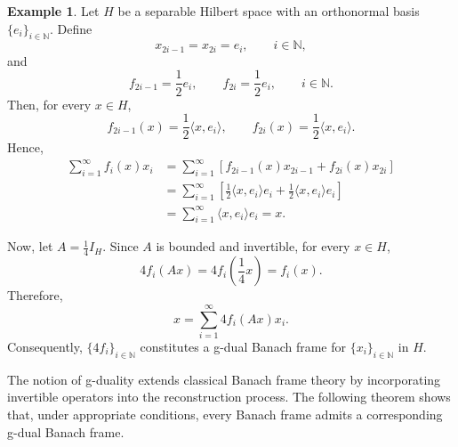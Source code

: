 \documentclass[12pt]{article}
\theoremstyle{definition}
\newtheorem{example}[theorem]{Example}
\theoremstyle{remark}
\begin{document}
\begin{example}
Let \(H\) be a separable Hilbert space with an orthonormal basis
\(\{e_i\}_{i\in\mathbb{N}}\). Define
\[
x_{2i-1}=x_{2i}=e_i,\qquad i\in\mathbb{N},
\]
and
\[
f_{2i-1}=\frac{1}{2}e_i,\qquad
f_{2i}=\frac{1}{2}e_i,\qquad i\in\mathbb{N}.
\]
Then, for every \(x\in H\),
\[
f_{2i-1}(x)=\frac{1}{2}\langle x,e_i\rangle,
\qquad
f_{2i}(x)=\frac{1}{2}\langle x,e_i\rangle.
\]
Hence,
\begin{align*}
	\sum_{i=1}^{\infty} f_i(x)x_i
	&=
	\sum_{i=1}^{\infty}
	\left[
	f_{2i-1}(x)x_{2i-1}
	+
	f_{2i}(x)x_{2i}
	\right]\\
	&=
	\sum_{i=1}^{\infty}
	\left[
	\frac{1}{2}\langle x,e_i\rangle e_i
	+
	\frac{1}{2}\langle x,e_i\rangle e_i
	\right]\\
	&=
	\sum_{i=1}^{\infty}
	\langle x,e_i\rangle e_i
	=x.
\end{align*}

Now, let \(A=\frac{1}{4}I_H\). Since \(A\) is bounded and invertible,
for every \(x\in H\),
\[
4f_i(Ax)
=
4f_i\left(\frac{1}{4}x\right)
=f_i(x).
\]
Therefore,
\[
x=\sum_{i=1}^{\infty}4f_i(Ax)x_i.
\]
Consequently, \(\{4f_i\}_{i\in\mathbb{N}}\) constitutes a
g-dual Banach frame for \(\{x_i\}_{i\in\mathbb{N}}\) in \(H\).
\end{example}


The notion of g-duality extends classical Banach frame theory by incorporating invertible operators into the reconstruction process. The following theorem shows that, under appropriate conditions, every Banach frame admits a corresponding g-dual Banach frame.
\end{document}
